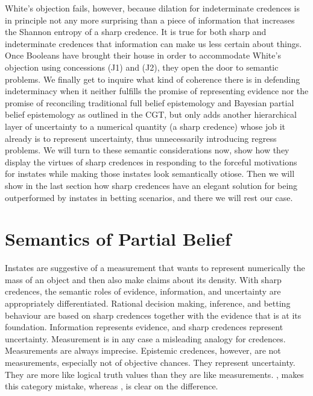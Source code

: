 \documentclass[11pt]{article}
\begin{document}
White's objection fails, however, because dilation for indeterminate credences is in principle not any more surprising than a piece of information that increases the Shannon entropy of a sharp credence. It is true for both sharp and indeterminate credences that information can make us less certain about things. Once Booleans have brought their house in order to accommodate White's objection using concessions (J1) and (J2), they open the door to semantic problems. We finally get to inquire what kind of coherence there is in defending indeterminacy when it neither fulfills the promise of representing evidence nor the promise of reconciling traditional full belief  epistemology and Bayesian partial belief epistemology as outlined in the CGT, but only adds another hierarchical layer of uncertainty to a numerical quantity (a sharp credence) whose job it already is to represent uncertainty, thus unnecessarily introducing regress problems. We will turn to these semantic considerations now, show how they display the virtues of sharp credences in responding to the forceful motivations for instates while making those instates look semantically otiose. Then we will show in the last section how sharp credences have an elegant solution for being outperformed by instates in betting scenarios, and there we will rest our case.

\section{Semantics of Partial Belief}
\label{SemanticsOfPartialBelief}

Instates are suggestive of a measurement that wants to represent numerically the mass of an object and then also make claims about its density. With sharp credences, the semantic roles of evidence, information, and uncertainty are appropriately differentiated. Rational decision making, inference, and betting behaviour are based on sharp credences together with the evidence that is at its foundation. Information represents evidence, and sharp credences represent uncertainty. Measurement is in any case a misleading analogy for credences. Measurements are always imprecise. Epistemic credences, however, are not measurements, especially not of objective chances. They represent uncertainty. They are more like logical truth values than they are like measurements. , makes this category mistake, whereas , is clear on the difference.
\end{document}
